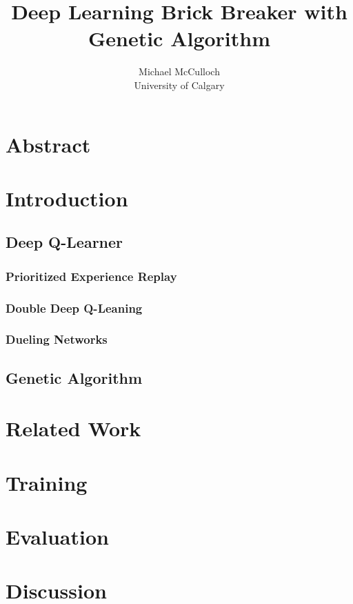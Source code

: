 \documentclass[letterpaper,twocolumn,10pt]{article}
\begin{document}
    
    \date{}
    
    \title{\Large \bf Deep Learning Brick Breaker with Genetic Algorithm}
    
    \author{Michael McCulloch \\ University of Calgary}
    
    \maketitle
    
    \thispagestyle{empty}

    \section{Abstract}
    \section{Introduction}
        \subsection{Deep Q-Learner}
            \subsubsection{Prioritized Experience Replay}
            \subsubsection{Double Deep Q-Leaning}
            \subsubsection{Dueling Networks}
        \subsection{Genetic Algorithm}
    \section{Related Work}
    \section{Training}
    \section{Evaluation}
    \section{Discussion}

     
    
\end{document}
